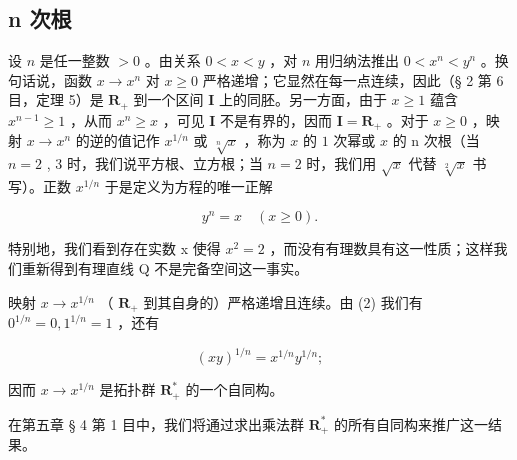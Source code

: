 \subsection{n 次根}

设 \(n\) 是任一整数 \(> 0\) 。由关系 \(0 < x < y\) ，对 \(n\) 用归纳法推出 \(0 < x^n < y^n\) 。换句话说，函数 \(x \to x^n\) 对 \(x \geqslant 0\) 严格递增；它显然在每一点连续，因此（§ 2 第 6 目，定理 5）是 \(\mathbf{R}_{+}\) 到一个区间 \(\mathbf{I}\) 上的同胚。另一方面，由于 \(x \geqslant 1\) 蕴含 \(x^{n-1} \geqslant 1\) ，从而 \(x^n \geqslant x\) ，可见 \(\mathbf{I}\) 不是有界的，因而 \(\mathbf{I} = \mathbf{R}_{+}\) 。对于 \(x \geqslant 0\) ，映射 \(x \to x^n\) 的逆的值记作 \(x^{1/n}\) 或 \(\sqrt[n]{x}\) ，称为 \(x\) 的 \(1\) 次幂或 \(x\) 的 n 次根（当 \(n = 2\) , 3 时，我们说平方根、立方根；当 \(n = 2\) 时，我们用 \(\sqrt{x}\) 代替 \(\sqrt[2]{x}\) 书写）。正数 \(x^{1/n}\) 于是定义为方程的唯一正解

\[
y ^ {n} = x \quad (x \geqslant 0).\tag{2}
\]

特别地，我们看到存在实数 x 使得 \(x^{2}=2\) ，而没有有理数具有这一性质；这样我们重新得到有理直线 Q 不是完备空间这一事实。

映射 \(x \to x^{1/n}\) （ \(\mathbf{R}_+\) 到其自身的）严格递增且连续。由 (2) 我们有 \(0^{1/n}=0, 1^{1/n}=1\) ，还有

\[
(x y) ^ {1 / n} = x ^ {1 / n} y ^ {1 / n};\tag{3}
\]

因而 \(x \to x^{1/n}\) 是拓扑群 \(\mathbf{R}_{+}^{*}\) 的一个自同构。

在第五章 § 4 第 1 目中，我们将通过求出乘法群 \(\mathbf{R}_{+}^{*}\) 的所有自同构来推广这一结果。

